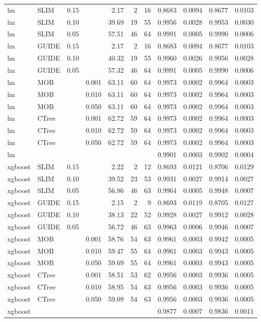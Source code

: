\begin{table}[!htb]
\begin{tabular}[t]{l|l|r|r|r|r|r|r|r|r|r}
\hline
lm & SLIM & 0.15 & & 2.17 & 2 & 16 & 0.8683 & 0.0094 & 0.8677 & 0.0103\\
lm & SLIM & 0.10 & & 39.69 & 19 & 55 & 0.9956 & 0.0028 & 0.9953 & 0.0030\\
lm & SLIM & 0.05 & & 57.51 & 46 & 64 & 0.9991 & 0.0005 & 0.9990 & 0.0006\\
lm & GUIDE & 0.15 & & 2.17 & 2 & 16 & 0.8683 & 0.0094 & 0.8677 & 0.0103\\
lm & GUIDE & 0.10 & & 40.32 & 19 & 55 & 0.9960 & 0.0026 & 0.9956 & 0.0028\\
lm & GUIDE & 0.05 & & 57.32 & 46 & 64 & 0.9991 & 0.0005 & 0.9990 & 0.0006\\
lm & MOB & & 0.001 & 63.11 & 60 & 64 & 0.9973 & 0.0002 & 0.9964 & 0.0003\\
lm & MOB & & 0.010 & 63.11 & 60 & 64 & 0.9973 & 0.0002 & 0.9964 & 0.0003\\
lm & MOB & & 0.050 & 63.11 & 60 & 64 & 0.9973 & 0.0002 & 0.9964 & 0.0003\\
lm & CTree & & 0.001 & 62.72 & 59 & 64 & 0.9973 & 0.0002 & 0.9964 & 0.0003\\
lm & CTree & & 0.010 & 62.72 & 59 & 64 & 0.9973 & 0.0002 & 0.9964 & 0.0003\\
lm & CTree & & 0.050 & 62.72 & 59 & 64 & 0.9973 & 0.0002 & 0.9964 & 0.0003\\
\hline
lm & & & & & & & 0.9901 & 0.0003 & 0.9902 & 0.0004\\
\hline


\hline
xgboost & SLIM & 0.15 & & 2.22 & 2 & 12 & 0.8693 & 0.0121 & 0.8706 & 0.0129\\
xgboost & SLIM & 0.10 & & 39.52 & 23 & 53 & 0.9931 & 0.0027 & 0.9914 & 0.0027\\
xgboost & SLIM & 0.05 & & 56.86 & 46 & 63 & 0.9964 & 0.0005 & 0.9948 & 0.0007\\
xgboost & GUIDE & 0.15 & & 2.15 & 2 & 9 & 0.8693 & 0.0119 & 0.8705 & 0.0127\\
xgboost & GUIDE & 0.10 & & 38.13 & 22 & 52 & 0.9928 & 0.0027 & 0.9912 & 0.0028\\
xgboost & GUIDE & 0.05 & & 56.72 & 46 & 63 & 0.9963 & 0.0006 & 0.9946 & 0.0007\\
xgboost & MOB & & 0.001 & 58.76 & 54 & 63 & 0.9961 & 0.0003 & 0.9942 & 0.0005\\
xgboost & MOB & & 0.010 & 59.47 & 55 & 64 & 0.9961 & 0.0003 & 0.9943 & 0.0005\\
xgboost & MOB & & 0.050 & 59.69 & 55 & 64 & 0.9961 & 0.0003 & 0.9943 & 0.0005\\
xgboost & CTree & & 0.001 & 58.51 & 53 & 62 & 0.9956 & 0.0003 & 0.9936 & 0.0005\\
xgboost & CTree & & 0.010 & 58.95 & 54 & 63 & 0.9956 & 0.0003 & 0.9936 & 0.0005\\
xgboost & CTree & & 0.050 & 59.09 & 54 & 63 & 0.9956 & 0.0003 & 0.9936 & 0.0005\\
\hline
xgboost & & & & & & & 0.9877 & 0.0007 & 0.9836 & 0.0011\\
\hline


\end{tabular}
\end{table}
